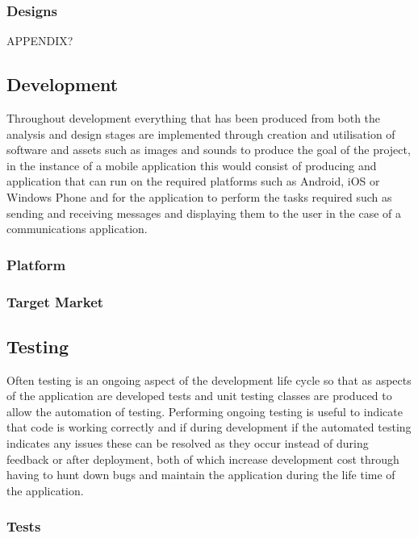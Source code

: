 \subsubsection{Designs}\label{designs}

APPENDIX?

\subsection{Development}\label{development}

Throughout development everything that has been produced from both the
analysis and design stages are implemented through creation and
utilisation of software and assets such as images and sounds to produce
the goal of the project, in the instance of a mobile application this
would consist of producing and application that can run on the required
platforms such as Android, iOS or Windows Phone and for the application
to perform the tasks required such as sending and receiving messages and
displaying them to the user in the case of a communications application.

\subsubsection{Platform}\label{platform}

\subsubsection{Target Market}\label{target-market}

\subsection{Testing}\label{testing}

Often testing is an ongoing aspect of the development life cycle so that
as aspects of the application are developed tests and unit testing
classes are produced to allow the automation of testing. Performing
ongoing testing is useful to indicate that code is working correctly and
if during development if the automated testing indicates any issues
these can be resolved as they occur instead of during feedback or after
deployment, both of which increase development cost through having to
hunt down bugs and maintain the application during the life time of the
application.

\subsubsection{Tests}\label{tests}

